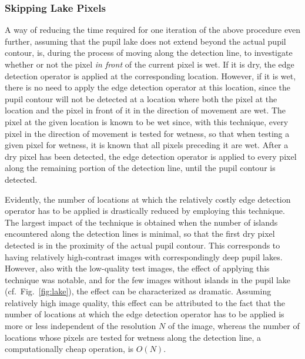 
\subsubsection{Skipping Lake Pixels}
\label{pg:skiplakepixels}

A way of reducing the time required for one iteration of the above
procedure even further, assuming that the pupil lake does not extend
beyond the actual pupil contour, is, during the process of moving
along the detection line, to investigate whether or not the pixel {\em
  in front\/} of the current pixel is wet.  If it is dry, the edge
detection operator is applied at the corresponding location.  However,
if it is wet, there is no need to apply the edge detection operator at
this location, since the pupil contour will not be detected at a
location where both the pixel at the location and the pixel in front
of it in the direction of movement are wet.  The pixel at the given
location is known to be wet since, with this technique, every pixel in
the direction of movement is tested for wetness, so that when testing
a given pixel for wetness, it is known that all pixels preceding it
are wet.  After a dry pixel has been detected, the edge detection
operator is applied to every pixel along the remaining portion of the
detection line, until the pupil contour is detected.

Evidently, the number of locations at which the relatively costly edge
detection operator has to be applied is drastically reduced by
employing this technique.  The largest impact of the technique is
obtained when the number of islands encountered along the detection
lines is minimal, so that the first dry pixel detected is in the
proximity of the actual pupil contour.  This corresponds to having
relatively high-contrast images with correspondingly deep pupil lakes.
However, also with the low-quality test images, the effect of applying
this technique was notable, and for the few images without islands in
the pupil lake (cf.\ Fig.~\ref{fig:lake}), the effect can be
characterized as dramatic.  Assuming relatively high image quality,
this effect can be attributed to the fact that the number of locations
at which the edge detection operator has to be applied is more or less
independent of the resolution $N$ of the image, whereas the number of
locations whose pixels are tested for wetness along the detection
line, a computationally cheap operation, is $O(N)$.

